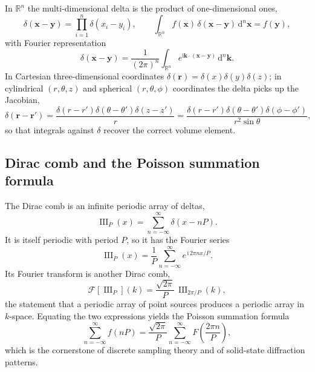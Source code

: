 In $\mathbb{R}^n$ the multi-dimensional delta is the product of one-dimensional ones,
\begin{equation}
\delta(\mathbf{x}-\mathbf{y})=\prod_{i=1}^n\delta(x_i-y_i),
\qquad
\int_{\mathbb{R}^n}f(\mathbf{x})\,\delta(\mathbf{x}-\mathbf{y})\,\mathrm{d}^n\mathbf{x}=f(\mathbf{y}),
\end{equation}
with Fourier representation
\begin{equation}
\delta(\mathbf{x}-\mathbf{y})=\frac{1}{(2\pi)^n}\int_{\mathbb{R}^n}e^{\mathrm{i}\mathbf{k}\cdot(\mathbf{x}-\mathbf{y})}\,\mathrm{d}^n\mathbf{k}.
\end{equation}
In Cartesian three-dimensional coordinates $\delta(\mathbf{r})=\delta(x)\delta(y)\delta(z)$; in cylindrical $(r,\theta,z)$ and spherical $(r,\theta,\phi)$ coordinates the delta picks up the Jacobian,
\begin{equation}
\delta(\mathbf{r}-\mathbf{r}')=\frac{\delta(r-r')\delta(\theta-\theta')\delta(z-z')}{r}
=\frac{\delta(r-r')\delta(\theta-\theta')\delta(\phi-\phi')}{r^2\sin\theta},
\end{equation}
so that integrals against $\delta$ recover the correct volume element.

\subsection{Dirac comb and the Poisson summation formula}

The Dirac comb is an infinite periodic array of deltas,
\begin{equation}
\mathop{\mathrm{III}}\nolimits_P(x)=\sum_{n=-\infty}^{\infty}\delta(x-nP).
\end{equation}
It is itself periodic with period $P$, so it has the Fourier series
\begin{equation}
\mathop{\mathrm{III}}\nolimits_P(x)=\frac{1}{P}\sum_{n=-\infty}^{\infty}e^{\,\mathrm{i}\,2\pi nx/P}.
\end{equation}
Its Fourier transform is another Dirac comb,
\begin{equation}
\mathcal{F}\!\left[\mathop{\mathrm{III}}\nolimits_P\right](k)=\frac{\sqrt{2\pi}}{P}\,\mathop{\mathrm{III}}\nolimits_{2\pi/P}(k),
\end{equation}
the statement that a periodic array of point sources produces a periodic array in $k$-space. Equating the two expressions yields the Poisson summation formula
\begin{equation}
\sum_{n=-\infty}^{\infty}f(nP)=\frac{\sqrt{2\pi}}{P}\sum_{n=-\infty}^{\infty}F\!\left(\frac{2\pi n}{P}\right),
\end{equation}
which is the cornerstone of discrete sampling theory and of solid-state diffraction patterns.

